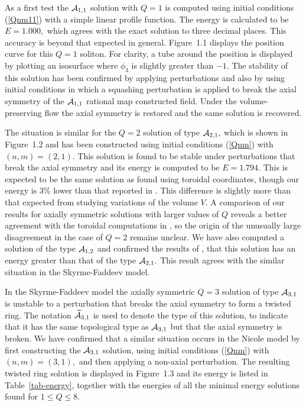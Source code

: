 \documentclass[12pt]{article}
\begin{document}
As a first test the ${\cal A}_{1,1}$ solution with $Q=1$ is
computed using initial conditions (\ref{Qnm11}) 
with a simple linear profile
function. The energy is 
calculated to be $E=1.000,$ which agrees with the exact 
solution to three decimal places.
This accuracy is beyond that expected in general. 
Figure~1.1 displays the position curve for this $Q=1$ soliton. 
For clarity, a tube around the position is displayed by plotting 
an isosurface where $\phi_3$ is slightly greater than $-1$.
The stability of this solution has been confirmed by 
applying perturbations and also by using initial
conditions in which a squashing perturbation is applied to break
 the axial symmetry of the ${\cal A}_{1,1}$ rational map constructed
field. Under the volume-preserving flow the axial symmetry
is restored and the same solution is recovered.

The situation is similar for the $Q=2$ solution of type
${\cal A}_{2,1},$ which is shown in Figure~1.2
and has been constructed using initial conditions (\ref{Qnm}) with
$(n,m)=(2,1).$
This solution is
found to be stable under perturbations that break the axial
symmetry and its energy is computed to be $E=1.794.$  
This is expected to be the same solution as found using
toroidal coordinates, though our energy is $3\%$ 
lower than that reported in \cite{ASVW}. This difference
is slightly more than that expected from studying variations of the
volume $V.$ A comparison of our results for axially symmetric
solutions with larger values of $Q$ reveals a better agreement
with the toroidal computations in \cite{ASVW}, so the origin of
the unusually large disagreement in the case of $Q=2$ remains
unclear. We have also computed a solution of the type 
${\cal A}_{1,2}$ and confirmed the results of \cite{ASVW}, that
this solution has an energy greater than that of the 
type ${\cal A}_{2,1}.$ This result agrees with the similar
situation in the Skyrme-Faddeev model.

In the Skyrme-Faddeev model the axially symmetric 
$Q=3$ solution of type ${\cal A}_{3,1}$ is unstable to
a perturbation that breaks the axial symmetry \cite{BS5} to
form a twisted ring. The notation $\widetilde {\cal A}_{3,1}$
is used to denote the type of this solution, to indicate that
it has the same topological type as ${\cal A}_{3,1}$ but that
the axial symmetry is broken.
We have confirmed that a similar situation occurs 
in the Nicole model by first constructing the ${\cal A}_{3,1}$
solution,
using initial conditions (\ref{Qnm}) with
$(n,m)=(3,1),$
 and then applying a non-axial perturbation. The resulting
twisted ring solution is displayed in Figure~1.3 and its energy
is listed in Table~\ref{tab-energy}, together with the
energies of all the minimal energy solutions found for 
$1\le Q\le 8.$
\end{document}
